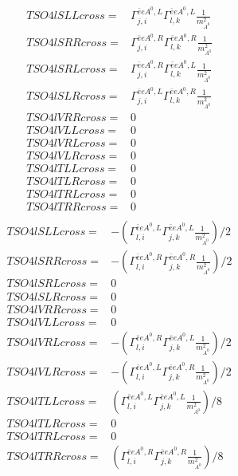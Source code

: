 \documentclass[A4,landscape]{article}
\begin{document}
\begin{align} 
  TSO4lSLLcross= & \Gamma^{\bar{e}e A^0 ,L}_{j, i} \Gamma^{\bar{e}e A^0 ,L}_{l, k} \frac{1}{m^2_{A^0}} \\ 
  TSO4lSRRcross= & \Gamma^{\bar{e}e A^0 ,R}_{j, i} \Gamma^{\bar{e}e A^0 ,R}_{l, k} \frac{1}{m^2_{A^0}} \\ 
  TSO4lSRLcross= & \Gamma^{\bar{e}e A^0 ,R}_{j, i} \Gamma^{\bar{e}e A^0 ,L}_{l, k} \frac{1}{m^2_{A^0}} \\ 
  TSO4lSLRcross= & \Gamma^{\bar{e}e A^0 ,L}_{j, i} \Gamma^{\bar{e}e A^0 ,R}_{l, k} \frac{1}{m^2_{A^0}} \\ 
  TSO4lVRRcross= & 0 \\ 
  TSO4lVLLcross= & 0 \\ 
  TSO4lVRLcross= & 0 \\ 
  TSO4lVLRcross= & 0 \\ 
  TSO4lTLLcross= & 0 \\ 
  TSO4lTLRcross= & 0 \\ 
  TSO4lTRLcross= & 0 \\ 
  TSO4lTRRcross= & 0 \\ 
\end{align} 
\begin{align} 
  TSO4lSLLcross= & -(\Gamma^{\bar{e}e A^0 ,L}_{l, i} \Gamma^{\bar{e}e A^0 ,L}_{j, k} \frac{1}{m^2_{A^0}})/2 \\ 
  TSO4lSRRcross= & -(\Gamma^{\bar{e}e A^0 ,R}_{l, i} \Gamma^{\bar{e}e A^0 ,R}_{j, k} \frac{1}{m^2_{A^0}})/2 \\ 
  TSO4lSRLcross= & 0 \\ 
  TSO4lSLRcross= & 0 \\ 
  TSO4lVRRcross= & 0 \\ 
  TSO4lVLLcross= & 0 \\ 
  TSO4lVRLcross= & -(\Gamma^{\bar{e}e A^0 ,R}_{l, i} \Gamma^{\bar{e}e A^0 ,L}_{j, k} \frac{1}{m^2_{A^0}})/2 \\ 
  TSO4lVLRcross= & -(\Gamma^{\bar{e}e A^0 ,L}_{l, i} \Gamma^{\bar{e}e A^0 ,R}_{j, k} \frac{1}{m^2_{A^0}})/2 \\ 
  TSO4lTLLcross= & (\Gamma^{\bar{e}e A^0 ,L}_{l, i} \Gamma^{\bar{e}e A^0 ,L}_{j, k} \frac{1}{m^2_{A^0}})/8 \\ 
  TSO4lTLRcross= & 0 \\ 
  TSO4lTRLcross= & 0 \\ 
  TSO4lTRRcross= & (\Gamma^{\bar{e}e A^0 ,R}_{l, i} \Gamma^{\bar{e}e A^0 ,R}_{j, k} \frac{1}{m^2_{A^0}})/8 \\ 
\end{align} 
\end{document}
